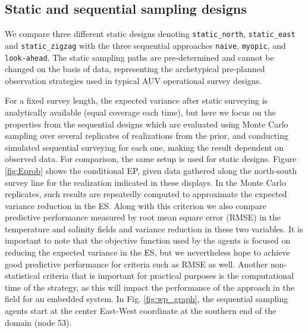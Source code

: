 \documentclass[aoas]{imsart}
\begin{document}
\newpage
\subsection{Static and sequential sampling designs}\label{sec:sampling_designs}


We compare three different static designs denoting
\texttt{static\_north}, \texttt{static\_east} and
\texttt{static\_zigzag} with the three sequential approaches
\texttt{naive}, \texttt{myopic}, and \texttt{look-ahead}. The static
sampling paths are pre-determined and cannot be changed on the basis
of data, representing the archetypical pre-planned observation
strategies used in typical AUV operational survey designs.

For a fixed survey length, the expected variance after static
surveying is analytically available (equal coverage each time), but
here we focus on the properties from the sequential designs which are
evaluated using Monte Carlo sampling over several replicates of
realizations from the prior, and conducting simulated sequential
surveying for each one, making the result dependent on observed
data. For comparison, the same setup is used for static
designs. Figure \ref{fig:Eprob} shows the conditional EP, given data
gathered along the north-south survey line for the realization
indicated in these displays. In the Monte Carlo replicates, such
results are repeatedly computed to approximate the expected variance
reduction in the ES. Along with this criterion we also compare
predictive performance measured by root mean square error (RMSE) in
the temperature and salinity fields and variance reduction in these
two variables. It is important to note that the objective function
used by the agents is focused on reducing the expected variance in the
ES, but we nevertheless hope to achieve good predictive performance
for criteria such as RMSE as well. Another non-statistical criteria
that is important for practical purposes is the computational time of
the strategy, as this will impact the performance of the approach in
the field for an embedded system. In Fig. \ref{fig:wp_graph}, the
sequential sampling agents start at the center East-West coordinate at
the southern end of the domain (node 53).
\end{document}

